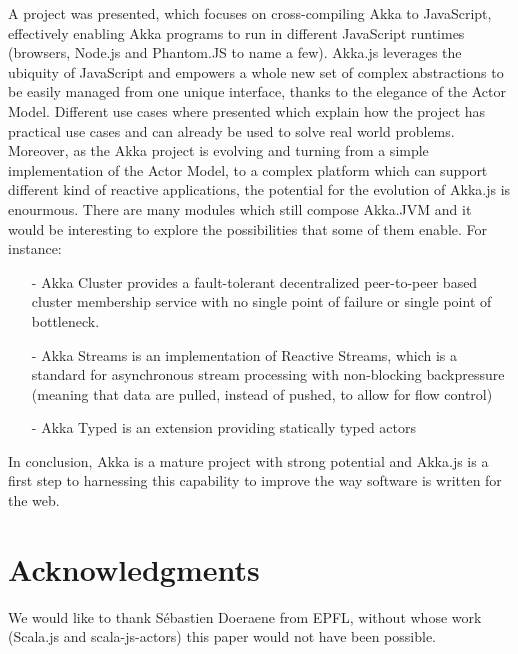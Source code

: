 \documentclass{sig-alternate}
\begin{document}
A project was presented, which focuses on cross-compiling Akka to JavaScript, effectively enabling Akka programs to run in different 
JavaScript runtimes (browsers, Node.js and Phantom.JS to name a few).
Akka.js leverages the ubiquity of JavaScript and empowers a whole new set of complex abstractions to be easily managed from one
unique interface, thanks to the elegance of the Actor Model. Different use cases where presented which explain how the project
has practical use cases and can already be used to solve real world problems.
Moreover, as the Akka project is evolving and turning from a simple implementation of the Actor Model, to a complex platform
which can support different kind of reactive applications, the potential for the evolution of Akka.js is enourmous.
There are many modules which still compose Akka.JVM and it would be interesting to explore the possibilities that some of them
enable. For instance:
\begin{itemize}
\item[-] Akka Cluster provides a fault-tolerant decentralized peer-to-peer based cluster membership service with no single point of failure or single point of bottleneck.
\item[-] Akka Streams is an implementation of Reactive Streams, which is a standard for asynchronous stream processing with non-blocking backpressure (meaning that data 
are pulled, instead of pushed, to allow for flow control)
\item[-] Akka Typed is an extension providing statically typed actors
\end{itemize}
In conclusion, Akka is a mature project with strong potential and Akka.js is a first step to harnessing this capability to 
improve the way software is written for the web.


\section{Acknowledgments}
We would like to thank Sébastien Doeraene from EPFL, without whose work (Scala.js and scala-js-actors) this paper would not have been possible.

%

%
%

\end{document}
